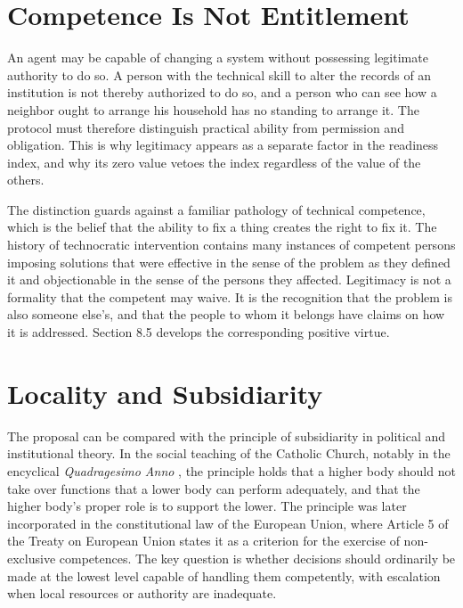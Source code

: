 \documentclass[11pt]{report}
\theoremstyle{definition}
\theoremstyle{remark}
\begin{document}
\section{Competence Is Not Entitlement}

An agent may be capable of changing a system without possessing legitimate authority to do so. A person with the technical skill to alter the records of an institution is not thereby authorized to do so, and a person who can see how a neighbor ought to arrange his household has no standing to arrange it. The protocol must therefore distinguish practical ability from permission and obligation. This is why legitimacy appears as a separate factor in the readiness index, and why its zero value vetoes the index regardless of the value of the others.

The distinction guards against a familiar pathology of technical competence, which is the belief that the ability to fix a thing creates the right to fix it. The history of technocratic intervention contains many instances of competent persons imposing solutions that were effective in the sense of the problem as they defined it and objectionable in the sense of the persons they affected. Legitimacy is not a formality that the competent may waive. It is the recognition that the problem is also someone else's, and that the people to whom it belongs have claims on how it is addressed. Section 8.5 develops the corresponding positive virtue.

\section{Locality and Subsidiarity}

The proposal can be compared with the principle of subsidiarity in political and institutional theory. In the social teaching of the Catholic Church, notably in the encyclical \emph{Quadragesimo Anno} \cite{pius}, the principle holds that a higher body should not take over functions that a lower body can perform adequately, and that the higher body's proper role is to support the lower. The principle was later incorporated in the constitutional law of the European Union, where Article 5 of the Treaty on European Union \cite{tue} states it as a criterion for the exercise of non-exclusive competences. The key question is whether decisions should ordinarily be made at the lowest level capable of handling them competently, with escalation when local resources or authority are inadequate.
\end{document}

